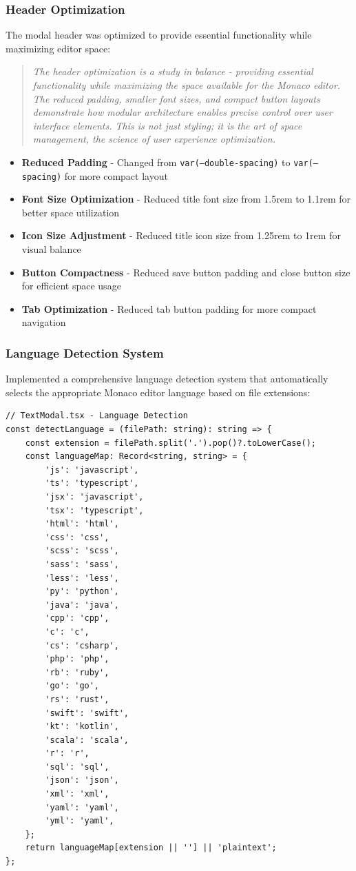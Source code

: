 \documentclass[11pt]{article}
\begin{document}
\subsubsection{Header Optimization}

The modal header was optimized to provide essential functionality while maximizing editor space:

\begin{quote}
\emph{The header optimization is a study in balance - providing essential functionality while maximizing the space available for the Monaco editor. The reduced padding, smaller font sizes, and compact button layouts demonstrate how modular architecture enables precise control over user interface elements. This is not just styling; it is the art of space management, the science of user experience optimization.}
\end{quote}

\begin{itemize}
\item \textbf{Reduced Padding} - Changed from \texttt{var(--double-spacing)} to \texttt{var(--spacing)} for more compact layout
\item \textbf{Font Size Optimization} - Reduced title font size from 1.5rem to 1.1rem for better space utilization
\item \textbf{Icon Size Adjustment} - Reduced title icon size from 1.25rem to 1rem for visual balance
\item \textbf{Button Compactness} - Reduced save button padding and close button size for efficient space usage
\item \textbf{Tab Optimization} - Reduced tab button padding for more compact navigation
\end{itemize}

\subsubsection{Language Detection System}

Implemented a comprehensive language detection system that automatically selects the appropriate Monaco editor language based on file extensions:

\begin{lstlisting}[style=typescript]
// TextModal.tsx - Language Detection
const detectLanguage = (filePath: string): string => {
    const extension = filePath.split('.').pop()?.toLowerCase();
    const languageMap: Record<string, string> = {
        'js': 'javascript',
        'ts': 'typescript',
        'jsx': 'javascript',
        'tsx': 'typescript',
        'html': 'html',
        'css': 'css',
        'scss': 'scss',
        'sass': 'sass',
        'less': 'less',
        'py': 'python',
        'java': 'java',
        'cpp': 'cpp',
        'c': 'c',
        'cs': 'csharp',
        'php': 'php',
        'rb': 'ruby',
        'go': 'go',
        'rs': 'rust',
        'swift': 'swift',
        'kt': 'kotlin',
        'scala': 'scala',
        'r': 'r',
        'sql': 'sql',
        'json': 'json',
        'xml': 'xml',
        'yaml': 'yaml',
        'yml': 'yaml',
    };
    return languageMap[extension || ''] || 'plaintext';
};
\end{lstlisting}
\end{document}

